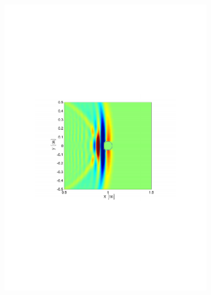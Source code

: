 \begin{figure}
\begin{subfigure}[b]{0.48\textwidth}
                \includegraphics[width=\textwidth]{grafiken/02_Konzeptionierung/sim_wave_3000_2}
        \end{subfigure}
        ~ %
        \begin{subfigure}[b]{0.48\textwidth}
                \centering

\end{subfigure}
\end{figure}
